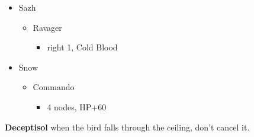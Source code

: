 \begin{menu}
\begin{itemize}
    \crystarium
    \begin{itemize}
        \item Sazh
        \begin{itemize}
            \item Ravager
            \begin{itemize}
                \item right 1, Cold Blood
            \end{itemize}
        \end{itemize}
        \item Snow
        \begin{itemize}
            \item Commando
            \begin{itemize}
                \item 4 nodes, HP+60
            \end{itemize}
        \end{itemize}
    \end{itemize}
\end{itemize}
\end{menu}


\textbf{Deceptisol} when the bird falls through the ceiling, don't cancel it.

